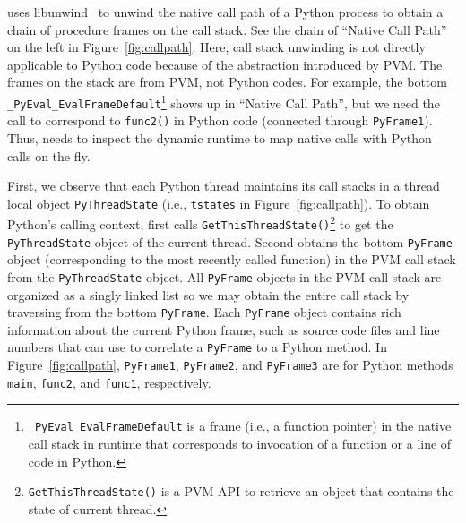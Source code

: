 
\tool{} uses libunwind~\cite{libunwind} to unwind the native call path of a Python process to obtain a chain of procedure frames on the call stack. See the chain of ``Native Call Path'' on the left in Figure~\ref{fig:callpath}.
Here, call stack unwinding is not directly applicable to Python code because of the abstraction introduced by PVM. 
The frames on the stack are from PVM, not Python codes. %
For example, the bottom {\tt \_PyEval\_EvalFrameDefault}\footnote{{\tt \_PyEval\_EvalFrameDefault} is a frame (i.e., a function pointer) in the native call stack in runtime that corresponds to invocation of a function or a line of code in Python.} shows up in ``Native Call Path'', but we need the call to correspond to {\tt func2()} in Python code (connected through {\tt PyFrame1}). Thus, \tool{} needs to inspect the dynamic runtime to map native calls with Python calls on the fly. 



 First, we observe that each Python thread maintains its call stacks in a thread local object {\tt PyThreadState} (i.e., {\tt tstates} in Figure~\ref{fig:callpath}).  
To obtain Python's calling context, \tool{} first calls {\tt GetThisThreadState()}\footnote{{\tt GetThisThreadState()} is a PVM API to retrieve an object that contains the state of current thread.} to get the {\tt PyThreadState} object of the current thread. Second \tool{} obtains the bottom {\tt PyFrame} object (corresponding to the most recently called function) in the PVM call stack from the {\tt PyThreadState} object. All {\tt PyFrame} objects in the PVM call stack are organized as a singly linked list so we may obtain the entire call stack by traversing from the bottom {\tt PyFrame}.  
Each {\tt PyFrame} object contains rich information about the current Python frame, such as source code files and line numbers that \tool{} can use to correlate a {\tt PyFrame} to a Python method. In Figure~\ref{fig:callpath}, {\tt PyFrame1}, {\tt PyFrame2}, and {\tt PyFrame3} are for Python methods {\tt main}, {\tt func2}, and {\tt func1}, respectively. 


